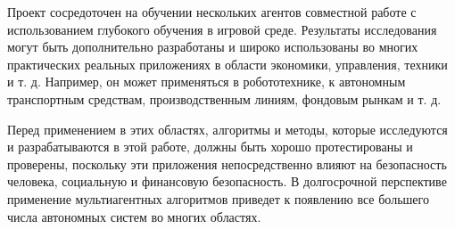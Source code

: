 Проект сосредоточен на обучении нескольких агентов совместной работе с использованием глубокого обучения в игровой среде. Результаты исследования могут быть дополнительно разработаны и широко использованы во многих практических реальных приложениях в области экономики, управления, техники и т. д. Например, он может применяться в робототехнике, к автономным транспортным средствам, производственным линиям, фондовым рынкам и т. д.

Перед применением в этих областях, алгоритмы и методы, которые исследуются и разрабатываются в этой работе, должны быть хорошо протестированы и проверены, поскольку эти приложения непосредственно влияют на безопасность человека, социальную и финансовую безопасность. В долгосрочной перспективе применение мультиагентных алгоритмов приведет к появлению все большего числа автономных систем во многих областях. 


